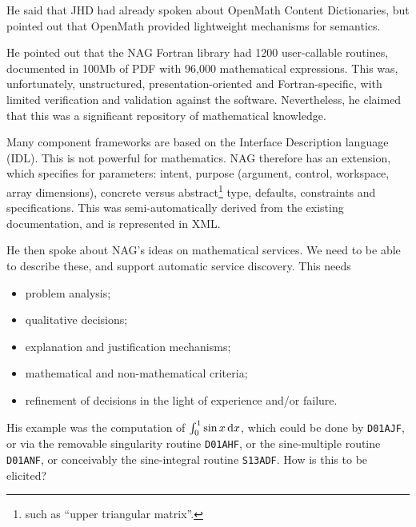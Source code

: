 \documentclass[11pt, a4paper]{article}
\begin{document}
He said that JHD had already spoken about OpenMath Content Dictionaries, but
pointed out that OpenMath provided lightweight mechanisms for semantics.
\par
He pointed out that the NAG Fortran library had 1200 user-callable
routines, documented in 100Mb of PDF with 96,000 mathematical expressions.
This was, unfortunately, unstructured, presentation-oriented and
Fortran-specific, with limited verification and validation against the
software. Nevertheless, he claimed that this was a significant repository
of mathematical knowledge.
\par
Many component frameworks are based on the Interface Description language
(IDL). This is not powerful for mathematics. NAG therefore has an
extension, which specifies for parameters: intent, purpose (argument,
control, workspace, array dimensions), concrete versus
abstract\footnote{such as ``upper triangular matrix''.} type, defaults,
constraints and specifications. This was semi-automatically derived from
the existing documentation, and is represented in XML.
\par
He then spoke about NAG's ideas on mathematical services. We need to be
able to describe these, and support automatic service discovery. This needs
\begin{itemize}
\item problem analysis;
\item qualitative decisions;
\item explanation and justification mechanisms;
\item mathematical and non-mathematical criteria;
\item refinement of decisions in the light of experience and/or failure.
\end{itemize}
His example was the computation of $\int_0^1\sin x\,{\rm d}x$, which could
be done by \verb+D01AJF+, or via the removable singularity routine
\verb+D01AHF+, or the sine-multiple routine \verb+D01ANF+, or conceivably
the sine-integral routine \verb+S13ADF+. How is this to be elicited?
\end{document}
